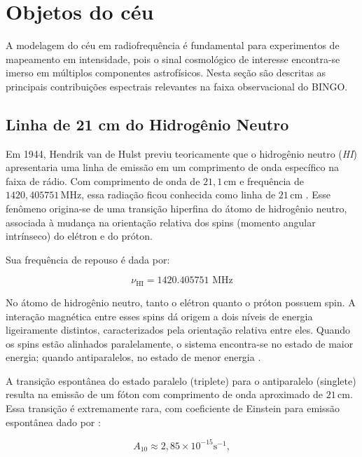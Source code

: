 \section{Objetos do céu}
A modelagem do céu em radiofrequência é fundamental para experimentos de mapeamento em intensidade, pois o sinal cosmológico de interesse encontra-se imerso em múltiplos componentes astrofísicos. Nesta seção são descritas as principais contribuições espectrais relevantes na faixa observacional do BINGO.

\subsection{Linha de 21 cm do Hidrogênio Neutro}

Em 1944, Hendrik van de Hulst previu teoricamente que o hidrogênio neutro (\textit{HI}) apresentaria uma linha de emissão em um comprimento de onda específico na faixa de rádio. Com comprimento de onda de \(21{,}1\,\text{cm}\) e frequência de \(1420{,}405751\,\text{MHz}\), essa radiação ficou conhecida como linha de \(21\,\text{cm}\) \cite{ufrgs_21cm_line, hossain2018salsa}. Esse fenômeno origina-se de uma transição hiperfina do átomo de hidrogênio neutro, associada à mudança na orientação relativa dos spins (momento angular intrínseco) do elétron e do próton.

Sua frequência de repouso é dada por:

\begin{equation}
    \nu_{\mathrm{HI}} = 1420.405751 \text{ MHz}
\end{equation}

No átomo de hidrogênio neutro, tanto o elétron quanto o próton possuem spin. A interação magnética entre esses spins dá origem a dois níveis de energia ligeiramente distintos, caracterizados pela orientação relativa entre eles. Quando os spins estão alinhados paralelamente, o sistema encontra-se no estado de maior energia; quando antiparalelos, no estado de menor energia \cite{ufrgs_21cm_line}.

A transição espontânea do estado paralelo (triplete) para o antiparalelo (singlete) resulta na emissão de um fóton com comprimento de onda aproximado de \(21\,\text{cm}\). Essa transição é extremamente rara, com coeficiente de Einstein para emissão espontânea dado por \cite{EEL2018}:

\begin{equation}
A_{10} \approx 2{,}85 \times 10^{-15} \text{s}^{-1},
\end{equation}

